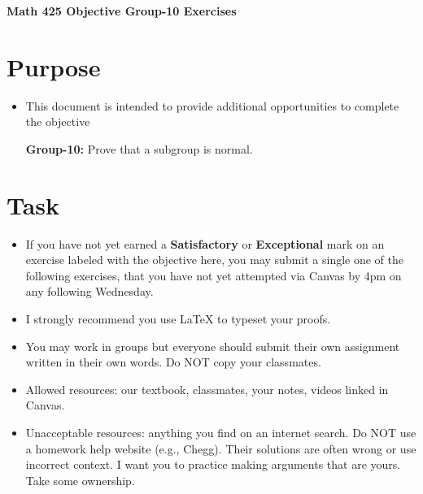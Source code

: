 \documentclass[12pt]{article}
\begin{document}
	\begin{center}
		{\Large \bf Math 425 Objective Group-10 Exercises}
	\end{center}
	\section*{Purpose}
	\begin{itemize}
		\item This document is intended to provide additional opportunities to complete the objective
		
		\textbf{Group-10:} Prove that a subgroup is normal.
	\end{itemize}
	\section*{Task}
	\begin{itemize}
		\item If you have not yet earned a \textbf{Satisfactory} or \textbf{Exceptional} mark on an exercise labeled with the objective here, you may submit a single one of the following exercises, that you have not yet attempted via Canvas by 4pm on any following Wednesday.
		\item I strongly recommend you use LaTeX to typeset your proofs.
		\item You may work in groups but everyone should submit their own assignment written in their own words.  Do NOT copy your classmates.
		\item Allowed resources: our textbook, classmates, your notes, videos linked in Canvas.
		\item Unacceptable resources: anything you find on an internet search. Do NOT use a homework help website (e.g., Chegg). Their solutions are often wrong or use incorrect context.  I want you to practice making arguments that are yours. Take some ownership.
	\end{itemize}
\end{document}
